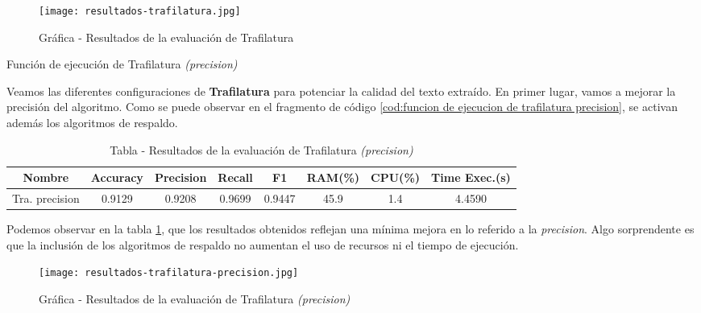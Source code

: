 \begin{figure}[tphb]
    \centering
    \texttt{[image: resultados-trafilatura.jpg]}
    \caption{Gráfica - Resultados de la evaluación de Trafilatura}
    \label{img:grafica - resultados de la evaluacion de trafilatura}
\end{figure}

\begin{codefloat}
    
    \caption{Función de ejecución de Trafilatura \emph{(precision)}}
    \label{cod:funcion de ejecucion de trafilatura precision}
\end{codefloat}

Veamos las diferentes configuraciones de \textbf{Trafilatura} para potenciar la calidad del texto extraído.
En primer lugar, vamos a mejorar la precisión del algoritmo. Como se puede observar en el fragmento de
código \ref{cod:funcion de ejecucion de trafilatura precision}, se activan además los algoritmos de respaldo.

\begin{table}[h]
    \begin{center}
      \begin{tabular}{| c | c | c | c | c | c | c | c |} \hline 
       \textbf{Nombre} & \textbf{Accuracy} & \textbf{Precision}  & \textbf{Recall} & \textbf{F1} & \textbf{RAM(\%)} & \textbf{CPU(\%)} & \textbf{Time Exec.(s)} \\ \hline
       Tra. precision & 0.9129 & 0.9208 & 0.9699 & 0.9447 & 45.9 & 1.4 & 4.4590 \\ \hline
      \end{tabular}
      \caption{Tabla - Resultados de la evaluación de Trafilatura \emph{(precision)}}
      \label{tab:tabla - resultados de la evaluacion de trafilatura precision}
    \end{center}
\end{table}

Podemos observar en la tabla \ref{tab:tabla - resultados de la evaluacion de trafilatura precision}, que
los resultados obtenidos reflejan una mínima mejora en lo referido a la \emph{precision}. Algo sorprendente
es que la inclusión de los algoritmos de respaldo no aumentan el uso de recursos ni el tiempo de ejecución.

\begin{figure}[tphb]
    \centering
    \texttt{[image: resultados-trafilatura-precision.jpg]}
    \caption{Gráfica - Resultados de la evaluación de Trafilatura \emph{(precision)}}
    \label{img:grafica - resultados de la evaluacion de trafilatura precision}
\end{figure}

